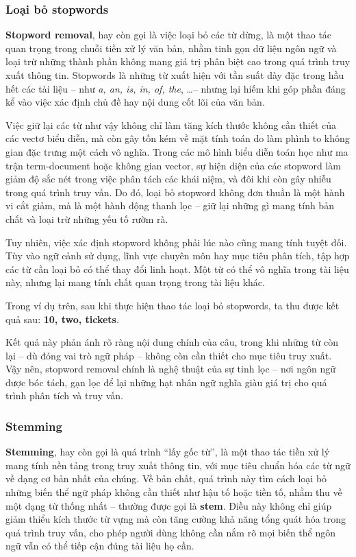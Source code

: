 \subsubsection{Loại bỏ stopwords}
\textbf{Stopword removal}, hay còn gọi là việc loại bỏ các từ dừng, là một thao tác quan trọng trong chuỗi tiền xử lý văn bản, nhằm tinh gọn dữ liệu ngôn ngữ và loại trừ những thành phần không mang giá trị phân biệt cao trong quá trình truy xuất thông tin. Stopwords là những từ xuất hiện với tần suất dày đặc trong hầu hết các tài liệu -- như \textit{a, an, is, in, of, the}, \dots -- nhưng lại hiếm khi góp phần đáng kể vào việc xác định chủ đề hay nội dung cốt lõi của văn bản.

Việc giữ lại các từ như vậy không chỉ làm tăng kích thước không cần thiết của các vectơ biểu diễn, mà còn gây tốn kém về mặt tính toán do làm phình to không gian đặc trưng một cách vô nghĩa. Trong các mô hình biểu diễn toán học như ma trận term-document hoặc không gian vector, sự hiện diện của các stopword làm giảm độ sắc nét trong việc phân tách các khái niệm, và đôi khi còn gây nhiễu trong quá trình truy vấn. Do đó, loại bỏ stopword không đơn thuần là một hành vi cắt giảm, mà là một hành động thanh lọc -- giữ lại những gì mang tính bản chất và loại trừ những yếu tố rườm rà.

Tuy nhiên, việc xác định stopword không phải lúc nào cũng mang tính tuyệt đối. Tùy vào ngữ cảnh sử dụng, lĩnh vực chuyên môn hay mục tiêu phân tích, tập hợp các từ cần loại bỏ có thể thay đổi linh hoạt. Một từ có thể vô nghĩa trong tài liệu này, nhưng lại mang tính chất quan trọng trong tài liệu khác.

Trong ví dụ trên, sau khi thực hiện thao tác loại bỏ stopwords, ta thu được kết quả sau: \textbf{10, two, tickets}.

Kết quả này phản ánh rõ ràng nội dung chính của câu, trong khi những từ còn lại -- dù đóng vai trò ngữ pháp -- không còn cần thiết cho mục tiêu truy xuất. Vậy nên, stopword removal chính là nghệ thuật của sự tinh lọc -- nơi ngôn ngữ được bóc tách, gạn lọc để lại những hạt nhân ngữ nghĩa giàu giá trị cho quá trình phân tích và truy vấn.

\subsubsection{Stemming}
\textbf{Stemming}, hay còn gọi là quá trình ``lấy gốc từ'', là một thao tác tiền xử lý mang tính nền tảng trong truy xuất thông tin, với mục tiêu chuẩn hóa các từ ngữ về dạng cơ bản nhất của chúng. Về bản chất, quá trình này tìm cách loại bỏ những biến thể ngữ pháp không cần thiết như hậu tố hoặc tiền tố, nhằm thu về một dạng từ thống nhất -- thường được gọi là \textbf{stem}. Điều này không chỉ giúp giảm thiểu kích thước từ vựng mà còn tăng cường khả năng tổng quát hóa trong quá trình truy vấn, cho phép người dùng không cần nắm rõ mọi biến thể ngôn ngữ vẫn có thể tiếp cận đúng tài liệu họ cần.

